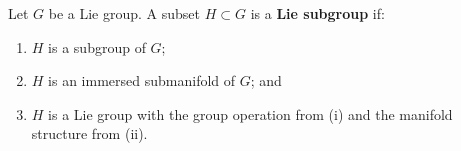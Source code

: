 Let $G$ be a Lie group. A subset $H \subset G$ is a \textbf{Lie subgroup} if:
\begin{enumerate}
\item[(i)] $H$ is a subgroup of $G$;
\item[(ii)] $H$ is an immersed submanifold of $G$; and
\item[(iii)] $H$ is a Lie group with the group operation from (i) and the manifold structure from (ii).
\end{enumerate}
